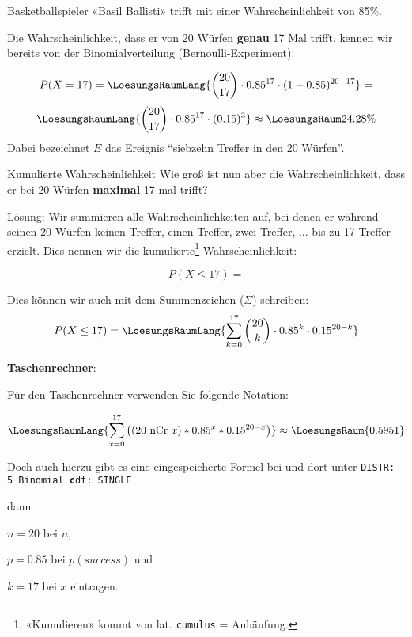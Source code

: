 Basketballspieler «Basil Ballisti» trifft mit einer
Wahrscheinlichkeit von 85\%.

Die Wahrscheinlichkeit, dass er von 20 Würfen \textbf{genau} 17 Mal trifft, kennen wir
bereits von der Binomialverteilung (Bernoulli-Experiment):

$$P(X=17) = \LoesungsRaumLang{{20 \choose 17}\cdot 0.85^{17}\cdot(1-0.85)^{20-17}}=$$
$$\LoesungsRaumLang{{20 \choose 17}\cdot 0.85^{17}\cdot (0.15)^{3}}\approx{}\LoesungsRaum{24.28\%}$$
Dabei bezeichnet $E$ das Ereignis ``siebzehn Treffer in den 20 Würfen''.

\begin{beispiel}{Kumulierte Wahrscheinlichkeit}{}
Wie groß ist nun aber die Wahrscheinlichkeit, dass er bei 20 Würfen
\textbf{maximal} 17 mal trifft?
\end{beispiel}


Lösung: Wir summieren alle Wahrscheinlichkeiten auf, bei denen er
während seinen 20 Würfen
keinen Treffer, einen Treffer, zwei Treffer, ... bis zu 17 Treffer
erzielt. Dies nennen wir die kumulierte\footnote{«Kumulieren» kommt von
  lat. \texttt{cumulus} = Anhäufung.} Wahrscheinlichkeit:

$$P(X\le 17) = $$

Dies können wir auch mit dem Summenzeichen ($\Sigma$) schreiben:
$$P(X\le 17) = \LoesungsRaumLang{\sum_{k=0}^{17} {20 \choose k} \cdot 0.85^k \cdot 0.15^{20-k}}$$

\newpage
\textbf{Taschenrechner}:

\leserluft

Für den Taschenrechner verwenden Sie folgende Notation: 

$$\LoesungsRaumLang{\sum_{x=0}^{17}\left(( 20 \textrm{\,\,nCr\,\,} x ) * 0.85^x *
0.15^{20-x}\right)} \approx \LoesungsRaum{0.5951}$$


Doch auch hierzu gibt es eine eingespeicherte Formel
bei
 und dort unter \texttt{DISTR: 5
  Binomial\textbf{\color{red} c}df: SINGLE}

dann

$n=20$ bei $n$,

$p=0.85$ bei $p(success)$ und

$k=17$ bei $x$ eintragen.



